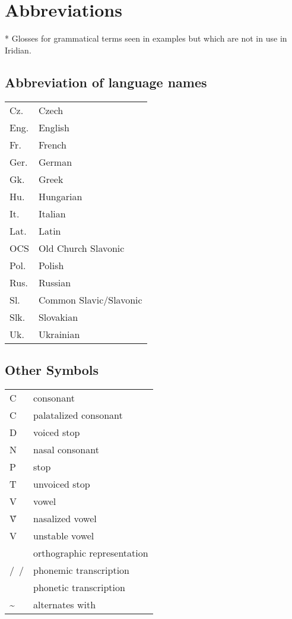
\chapter*{Abbreviations}
\printglossary[style=myglosses,type=\leipzigtype, title={Glossing abbreviations}]

\smallskip
* Glosses for grammatical terms seen in examples but which are not in use in Iridian.
\bigskip
\printglossary[style=langlist,type=\acronymtype, title={Abbreviation of language names}]

\clearpage

\section*{Abbreviation of language names}

\begin{longtabu} {YY[2.5]}
	Cz.		& Czech\\
	Eng.	& English\\
	Fr.		& French\\
	Ger.	& German\\
	Gk.		& Greek\\
	Hu.		& Hungarian\\
	It.		& Italian\\
	Lat.	& Latin\\
	OCS		& Old Church Slavonic\\
	Pol.	& Polish\\
	Rus.	& Russian\\
	Sl.		& Common Slavic/Slavonic\\
	Slk.	& Slovakian\\
	Uk.		& Ukrainian\\
\end{longtabu}


\section*{Other Symbols}
\begin{longtabu} {YY[2.5]}
	C 		& consonant\\
	C	& palatalized consonant\\
	D 		& voiced stop\\
	N 		& nasal consonant\\
	P 		& stop\\
	T 		& unvoiced stop\\
	V		& vowel\\
	Ṽ	 	& nasalized vowel\\
	V& unstable vowel\\
	\orth{~}& orthographic representation\\
	/~/		& phonemic transcription\\
	\nt{ }	& phonetic transcription\\
	\sim	& alternates with\\
\end{longtabu}
